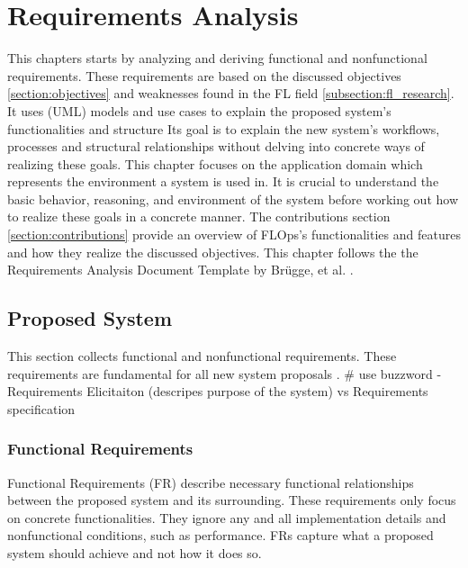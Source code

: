 \chapter{Requirements Analysis}

This chapters starts by analyzing and deriving functional and nonfunctional requirements.
These requirements are based on the discussed objectives \ref{section:objectives} and weaknesses found in the FL field \ref{subsection:fl_research}.
It uses (UML) models and use cases to explain the proposed system's functionalities and structure
Its goal is to explain the new system's workflows, processes and structural relationships without delving into concrete ways of realizing these goals.
This chapter focuses on the application domain which represents the environment a system is used in.
It is crucial to understand the basic behavior, reasoning, and environment of the system before working out how to realize these goals in a concrete manner.
The contributions section \ref{section:contributions} provide an overview of FLOps's functionalities and features and how they realize the discussed objectives.
This chapter follows the the Requirements Analysis Document Template by Brügge, et al. \cite{book:bruegge}.

\section{Proposed System}

This section collects functional and nonfunctional requirements.
These requirements are fundamental for all new system proposals \cite{book:bruegge}.
# use buzzword - Requirements Elicitaiton (descripes purpose of the system) vs Requirements specification

\subsection{Functional Requirements}
Functional Requirements (FR) describe necessary functional relationships between the proposed system and its surrounding.
These requirements only focus on concrete functionalities.
They ignore any and all implementation details and nonfunctional conditions, such as performance.
FRs capture what a proposed system should achieve and not how it does so. \cite{book:bruegge}

